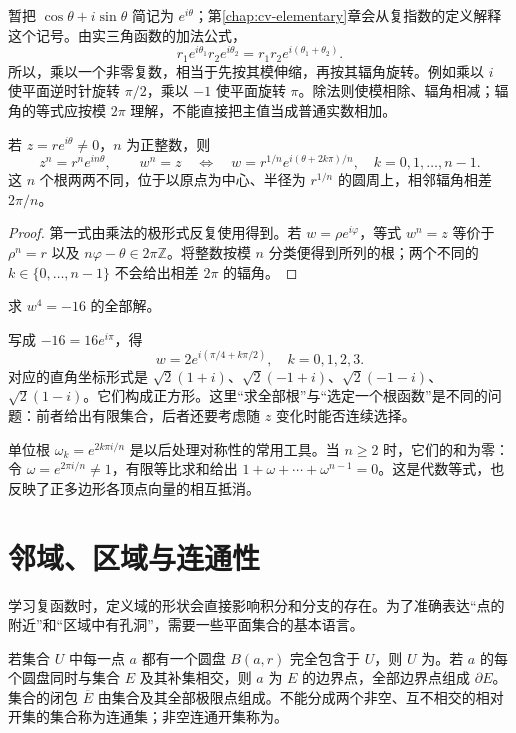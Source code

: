 \documentclass[UTF8,12pt,a4paper,fontset=fandol]{ctexbook}
\begin{document}
暂把 $\cos\theta+i\sin\theta$ 简记为 $e^{i\theta}$；第\ref{chap:cv-elementary}章会从复指数的定义解释这个记号。由实三角函数的加法公式，
\[
 r_1e^{i\theta_1}r_2e^{i\theta_2}
 =r_1r_2e^{i(\theta_1+\theta_2)}.
\]
所以，乘以一个非零复数，相当于先按其模伸缩，再按其辐角旋转。例如乘以 $i$ 使平面逆时针旋转 $\pi/2$，乘以 $-1$ 使平面旋转 $\pi$。除法则使模相除、辐角相减；辐角的等式应按模 $2\pi$ 理解，不能直接把主值当成普通实数相加。

\begin{proposition}[棣莫弗公式与复数的根]
若 $z=re^{i\theta}\ne0$，$n$ 为正整数，则
\[
 z^n=r^ne^{in\theta},\qquad
 w^n=z\quad\Longleftrightarrow\quad
 w=r^{1/n}e^{i(\theta+2k\pi)/n},\quad k=0,1,\ldots,n-1.
\]
这 $n$ 个根两两不同，位于以原点为中心、半径为 $r^{1/n}$ 的圆周上，相邻辐角相差 $2\pi/n$。
\end{proposition}
\begin{proof}
第一式由乘法的极形式反复使用得到。若 $w=\rho e^{i\varphi}$，等式 $w^n=z$ 等价于 $\rho^n=r$ 以及 $n\varphi-\theta\in2\pi\mathbb Z$。将整数按模 $n$ 分类便得到所列的根；两个不同的 $k\in\{0,\ldots,n-1\}$ 不会给出相差 $2\pi$ 的辐角。
\end{proof}

\begin{example}[四次根与根的对称性]
求 $w^4=-16$ 的全部解。
\end{example}
\begin{solve}
写成 $-16=16e^{i\pi}$，得
\[
 w=2e^{i(\pi/4+k\pi/2)},\quad k=0,1,2,3.
\]
对应的直角坐标形式是 $\sqrt2(1+i)$、$\sqrt2(-1+i)$、$\sqrt2(-1-i)$、$\sqrt2(1-i)$。它们构成正方形。这里“求全部根”与“选定一个根函数”是不同的问题：前者给出有限集合，后者还要考虑随 $z$ 变化时能否连续选择。
\end{solve}

单位根 $\omega_k=e^{2k\pi i/n}$ 是以后处理对称性的常用工具。当 $n\ge2$ 时，它们的和为零：令 $\omega=e^{2\pi i/n}\ne1$，有限等比求和给出 $1+\omega+\cdots+\omega^{n-1}=0$。这是代数等式，也反映了正多边形各顶点向量的相互抵消。

\section{邻域、区域与连通性}

学习复函数时，定义域的形状会直接影响积分和分支的存在。为了准确表达“点的附近”和“区域中有孔洞”，需要一些平面集合的基本语言。

\begin{definition}[开集、边界与区域]
若集合 $U$ 中每一点 $a$ 都有一个圆盘 $B(a,r)$ 完全包含于 $U$，则 $U$ 为。若 $a$ 的每个圆盘同时与集合 $E$ 及其补集相交，则 $a$ 为 $E$ 的边界点，全部边界点组成 $\partial E$。集合的闭包 $\overline E$ 由集合及其全部极限点组成。不能分成两个非空、互不相交的相对开集的集合称为连通集；非空连通开集称为。
\end{definition}
\end{document}

